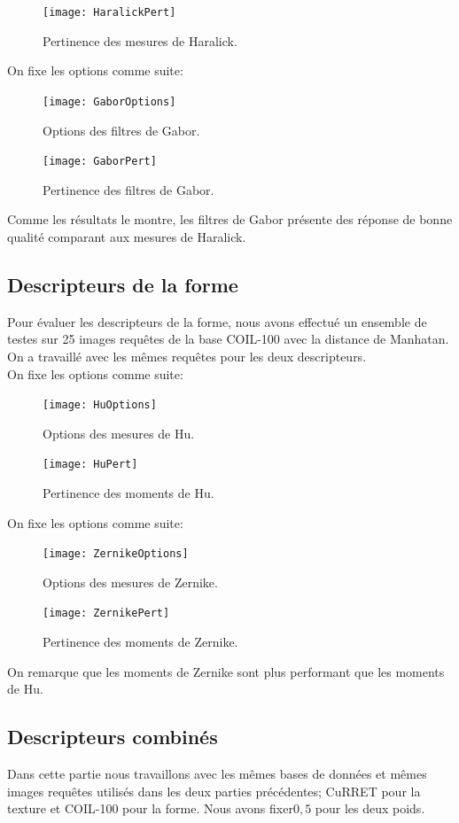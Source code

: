 \begin{figure}[H]
	\centering
	\texttt{[image: HaralickPert]} 
	\caption{Pertinence des mesures de Haralick.}
\end{figure}

On fixe les options comme suite:
\begin{figure}[H]
	\centering
	\texttt{[image: GaborOptions]} 
	\caption{Options  des filtres de Gabor.}
\end{figure}

\begin{figure}[H]
	\centering
	\texttt{[image: GaborPert]} 
	\caption{Pertinence des filtres de Gabor.}
\end{figure}
Comme les résultats le montre, les filtres de Gabor présente des réponse de bonne qualité comparant aux mesures de Haralick.
\subsection{Descripteurs de la forme}
Pour évaluer les descripteurs de la forme, nous avons effectué un ensemble de testes sur 25 images requêtes de la base COIL-100 avec la distance de Manhatan. On a travaillé avec les mêmes requêtes pour les deux descripteurs.\\

On fixe les options comme suite:
\begin{figure}[H]
	\centering
	\texttt{[image: HuOptions]} 
	\caption{Options des mesures de Hu.}
\end{figure}

\begin{figure}[H]
	\centering
	\texttt{[image: HuPert]} 
	\caption{Pertinence des moments de Hu.}
\end{figure}

On fixe les options comme suite:
\begin{figure}[H]
	\centering
	\texttt{[image: ZernikeOptions]} 
	\caption{Options des mesures de Zernike.}
\end{figure}
\begin{figure}[H]
	\centering
	\texttt{[image: ZernikePert]} 
	\caption{Pertinence des moments de Zernike.}
\end{figure}
On remarque que les moments de Zernike sont plus performant que les moments de Hu.
\subsection{Descripteurs combinés}
Dans cette partie nous travaillons avec les mêmes bases de données et mêmes images requêtes utilisés dans les deux parties précédentes; CuRRET pour la texture et COIL-100 pour la forme. Nous avons fixer$  0,5 $ pour les deux poids.

